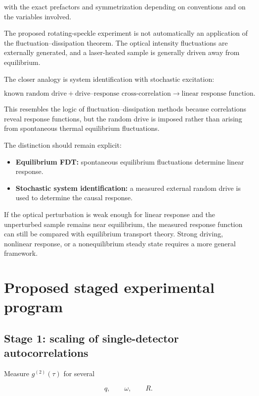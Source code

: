 \documentclass[11pt,letterpaper]{article}
\newcommand{\gtt}{g^{(2)}}
\begin{document}
with the exact prefactors and symmetrization depending on conventions and
on the variables involved.

The proposed rotating-speckle experiment is not automatically an
application of the fluctuation--dissipation theorem. The optical intensity
fluctuations are externally generated, and a laser-heated sample is
generally driven away from equilibrium.

The closer analogy is system identification with stochastic excitation:

\begin{equation}
    \text{known random drive}
    +
    \text{drive--response cross-correlation}
    \longrightarrow
    \text{linear response function}.
\end{equation}

This resembles the logic of fluctuation--dissipation methods because
correlations reveal response functions, but the random drive is imposed
rather than arising from spontaneous thermal equilibrium fluctuations.

The distinction should remain explicit:

\begin{itemize}[leftmargin=2em]
    \item \textbf{Equilibrium FDT:} spontaneous equilibrium fluctuations
    determine linear response.
    \item \textbf{Stochastic system identification:} a measured external
    random drive is used to determine the causal response.
\end{itemize}

If the optical perturbation is weak enough for linear response and the
unperturbed sample remains near equilibrium, the measured response function
can still be compared with equilibrium transport theory. Strong driving,
nonlinear response, or a nonequilibrium steady state requires a more general
framework.

\section{Proposed staged experimental program}

\subsection{Stage 1: scaling of single-detector autocorrelations}

Measure $\gtt(\tau)$ for several

\begin{equation}
    q,\qquad \omega,\qquad R.
\end{equation}
\end{document}
